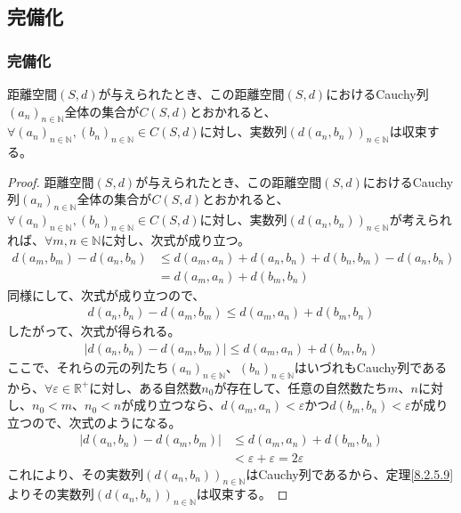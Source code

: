 \documentclass[dvipdfmx]{jsarticle}
\begin{document}
\subsection{完備化}%
\subsubsection{完備化}%
\begin{thm}\label{8.2.6.1}
距離空間$(S,d)$が与えられたとき、この距離空間$(S,d)$におけるCauchy列$\left( a_{n} \right)_{n \in \mathbb{N}}$全体の集合が$C(S,d)$とおかれると、$\forall\left( a_{n} \right)_{n \in \mathbb{N}},\left( b_{n} \right)_{n \in \mathbb{N}} \in C(S,d)$に対し、実数列$\left( d\left( a_{n},b_{n} \right) \right)_{n \in \mathbb{N}}$は収束する。
\end{thm}
\begin{proof}
距離空間$(S,d)$が与えられたとき、この距離空間$(S,d)$におけるCauchy列$\left( a_{n} \right)_{n \in \mathbb{N}}$全体の集合が$C(S,d)$とおかれると、$\forall\left( a_{n} \right)_{n \in \mathbb{N}},\left( b_{n} \right)_{n \in \mathbb{N}} \in C(S,d)$に対し、実数列$\left( d\left( a_{n},b_{n} \right) \right)_{n \in \mathbb{N}}$が考えられれば、$\forall m,n \in \mathbb{N}$に対し、次式が成り立つ。
\begin{align*}
d\left( a_{m},b_{m} \right) - d\left( a_{n},b_{n} \right) &\leq d\left( a_{m},a_{n} \right) + d\left( a_{n},b_{n} \right) + d\left( b_{n},b_{m} \right) - d\left( a_{n},b_{n} \right)\\
&= d\left( a_{m},a_{n} \right) + d\left( b_{m},b_{n} \right)
\end{align*}
同様にして、次式が成り立つので、
\begin{align*}
d\left( a_{n},b_{n} \right) - d\left( a_{m},b_{m} \right) \leq d\left( a_{m},a_{n} \right) + d\left( b_{m},b_{n} \right)
\end{align*}
したがって、次式が得られる。
\begin{align*}
\left| d\left( a_{n},b_{n} \right) - d\left( a_{m},b_{m} \right) \right| \leq d\left( a_{m},a_{n} \right) + d\left( b_{m},b_{n} \right)
\end{align*}
ここで、それらの元の列たち$\left( a_{n} \right)_{n \in \mathbb{N}}$、$\left( b_{n} \right)_{n \in \mathbb{N}}$はいづれもCauchy列であるから、$\forall\varepsilon \in \mathbb{R}^{+}$に対し、ある自然数$n_{0}$が存在して、任意の自然数たち$m$、$n$に対し、$n_{0} < m$、$n_{0} < n$が成り立つなら、$d\left( a_{m},a_{n} \right) < \varepsilon$かつ$d\left( b_{m},b_{n} \right) < \varepsilon$が成り立つので、次式のようになる。
\begin{align*}
\left| d\left( a_{n},b_{n} \right) - d\left( a_{m},b_{m} \right) \right| &\leq d\left( a_{m},a_{n} \right) + d\left( b_{m},b_{n} \right)\\
&< \varepsilon + \varepsilon = 2\varepsilon
\end{align*}
これにより、その実数列$\left( d\left( a_{n},b_{n} \right) \right)_{n \in \mathbb{N}}$はCauchy列であるから、定理\ref{8.2.5.9}よりその実数列$\left( d\left( a_{n},b_{n} \right) \right)_{n \in \mathbb{N}}$は収束する。
\end{proof}
\end{document}
